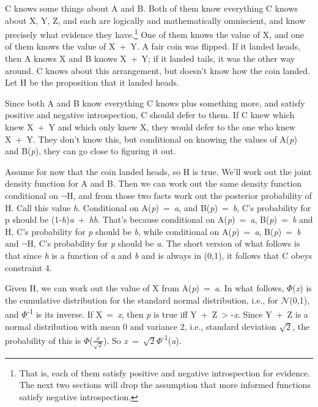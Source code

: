 \documentclass[
  12pt,
  letterpaper,
  DIV=11,
  numbers=noendperiod]{scrartcl}
\begin{document}
C knows some things about A and B. Both of them know everything C knows
about X, Y, Z, and each are logically and mathematically omniscient, and
know precisely what evidence they have.\footnote{That is, each of them
  satisfy positive and negative introspection for evidence. The next two
  sections will drop the assumption that more informed functions satisfy
  negative introspection.} One of them knows the value of X, and one of
them knows the value of X~+~Y. A fair coin was flipped. If it landed
heads, then A knows X and B knows X~+~Y; if it landed tails, it was the
other way around. C knows about this arrangement, but doesn't know how
the coin landed. Let H be the proposition that it landed heads.

Since both A and B know everything C knows plus something more, and
satisfy positive and negative introspection, C should defer to them. If
C knew which knew X~+~Y and which only knew X, they would defer to the
one who knew X~+~Y. They don't know this, but conditional on knowing the
values of A(\emph{p}) and B(\emph{p}), they can go close to figuring it
out.

Assume for now that the coin landed heads, so H is true. We'll work out
the joint density function for A and B. Then we can work out the same
density function conditional on $\neg$H, and from those two facts work out
the posterior probability of H. Call this value \emph{h}. Conditional on
A(\emph{p})~=~\emph{a}, and B(\emph{p})~=~\emph{b}, C's probability for
p should be (1-\emph{h})\emph{a}~+~\emph{hb}. That's because conditional
on A(\emph{p})~=~\emph{a}, B(\emph{p})~=~\emph{b} and H, C's probability
for \emph{p} should be \emph{b}, while conditional on
A(\emph{p})~=~\emph{a}, B(\emph{p})~=~\emph{b} and $\neg$H, C's probability
for \emph{p} should be \emph{a}. The short version of what follows is
that since \emph{h} is a function of \emph{a} and \emph{b} and is always
in (0,1), it follows that C obeys constraint 4.

Given H, we can work out the value of X from A(\emph{p})~=~\emph{a}. In
what follows, \(\Phi\)(\emph{x}) is the cumulative distribution for the
standard normal distribution, i.e., for \(\mathcal{N}\)(0,1), and
\(\Phi\)\textsuperscript{-1} is its inverse. If X~=~\emph{x}, then
\emph{p} is true iff Y~+~Z~\textgreater{} -\emph{x}. Since Y~+~Z is a
normal distribution with mean 0 and variance 2, i.e., standard deviation
\(\sqrt{2}\), the probability of this is
\(\Phi\)(\(\frac{x}{\sqrt{2}}\)). So
\emph{x}~=~\(\sqrt{2}\Phi\)\textsuperscript{-1}(\emph{a}).
\end{document}
